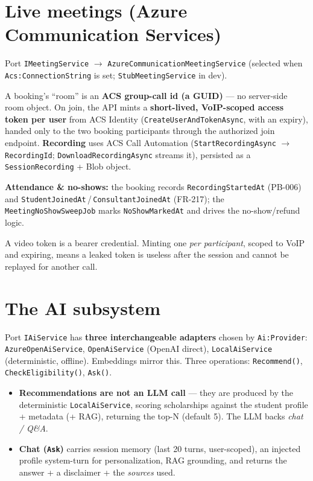 \documentclass[11pt,a4paper]{article}
\newcommand{\code}[1]{\texttt{\textcolor{spInk}{#1}}}
\begin{document}
\section{Live meetings (Azure Communication Services)}
Port \code{IMeetingService} $\rightarrow$ \code{AzureCommunicationMeetingService}
(selected when \code{Acs:ConnectionString} is set; \code{StubMeetingService} in dev).

\begin{howbox}
A booking's ``room'' is an \textbf{ACS group-call id (a GUID)} --- no server-side
room object. On join, the API mints a \textbf{short-lived, VoIP-scoped access
token per user} from ACS Identity (\code{CreateUserAndTokenAsync}, with an
expiry), handed only to the two booking participants through the authorized join
endpoint. \textbf{Recording} uses ACS Call Automation
(\code{StartRecordingAsync} $\rightarrow$ \code{RecordingId};
\code{DownloadRecordingAsync} streams it), persisted as a \code{SessionRecording}
+ Blob object.
\end{howbox}

\textbf{Attendance \& no-shows:} the booking records \code{RecordingStartedAt}
(PB-006) and \code{StudentJoinedAt}\,/\,\code{ConsultantJoinedAt} (FR-217); the
\code{MeetingNoShowSweepJob} marks \code{NoShowMarkedAt} and drives the
no-show/refund logic.

\begin{secbox}
A video token is a bearer credential. Minting one \emph{per participant}, scoped
to VoIP and expiring, means a leaked token is useless after the session and cannot
be replayed for another call.
\end{secbox}

\section{The AI subsystem}
Port \code{IAiService} has \textbf{three interchangeable adapters} chosen by
\code{Ai:Provider}: \code{AzureOpenAiService}, \code{OpenAiService} (OpenAI direct),
\code{LocalAiService} (deterministic, offline). Embeddings mirror this. Three
operations: \code{Recommend()}, \code{CheckEligibility()}, \code{Ask()}.

\begin{itemize}
\item \textbf{Recommendations are not an LLM call} --- they are produced by the
  deterministic \code{LocalAiService}, scoring scholarships against the student
  profile + metadata (+ RAG), returning the top-N (default 5). The LLM backs
  \emph{chat / Q\&A}.
\item \textbf{Chat (\code{Ask})} carries session memory (last 20 turns,
  user-scoped), an injected profile system-turn for personalization, RAG
  grounding, and returns the answer + a disclaimer + the \emph{sources} used.
\end{itemize}
\end{document}
